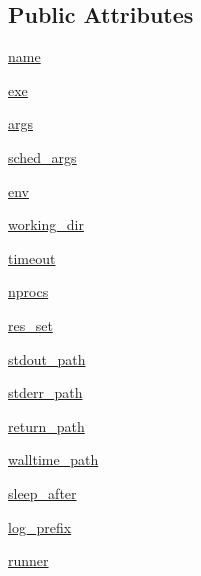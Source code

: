 \subsection*{Public Attributes}
\begin{DoxyCompactItemize}
\item 
\hyperlink{classcodar_1_1savanna_1_1model_1_1_run_a135987f2d76c2b733237f9128df90b55}{name}
\item 
\hyperlink{classcodar_1_1savanna_1_1model_1_1_run_af3869303fd11d0eea96c69adda61ffbf}{exe}
\item 
\hyperlink{classcodar_1_1savanna_1_1model_1_1_run_a2e95781a43d4b3146b10b98c6df429a4}{args}
\item 
\hyperlink{classcodar_1_1savanna_1_1model_1_1_run_a530b04dbe3d3a1feea2e970c2c7cc4a0}{sched\+\_\+args}
\item 
\hyperlink{classcodar_1_1savanna_1_1model_1_1_run_aca381aeba4c386241910c0ecffa97189}{env}
\item 
\hyperlink{classcodar_1_1savanna_1_1model_1_1_run_aa7acd6225eca948ecf25d122d1cca66d}{working\+\_\+dir}
\item 
\hyperlink{classcodar_1_1savanna_1_1model_1_1_run_abb445426d12c93f4b0fffaad44e46f78}{timeout}
\item 
\hyperlink{classcodar_1_1savanna_1_1model_1_1_run_afcec81e8eeb87cecb91a1101ad0b688a}{nprocs}
\item 
\hyperlink{classcodar_1_1savanna_1_1model_1_1_run_a558ab10e87015683e656fd0b8f9ea433}{res\+\_\+set}
\item 
\hyperlink{classcodar_1_1savanna_1_1model_1_1_run_a94ef5e9dc24c400534dc80d80ec5aeb0}{stdout\+\_\+path}
\item 
\hyperlink{classcodar_1_1savanna_1_1model_1_1_run_a55aa41b42450a290a508a17d57fe209d}{stderr\+\_\+path}
\item 
\hyperlink{classcodar_1_1savanna_1_1model_1_1_run_a497134b579d440c7b79281d57cc93aa7}{return\+\_\+path}
\item 
\hyperlink{classcodar_1_1savanna_1_1model_1_1_run_af0cf79c5f8c52048604391d984bd48bc}{walltime\+\_\+path}
\item 
\hyperlink{classcodar_1_1savanna_1_1model_1_1_run_a386d4496d2923fb080c5f43dd325c87b}{sleep\+\_\+after}
\item 
\hyperlink{classcodar_1_1savanna_1_1model_1_1_run_adccd41ed98f61dd602822096a1bdf517}{log\+\_\+prefix}
\item 
\hyperlink{classcodar_1_1savanna_1_1model_1_1_run_a4e689edb49d16bcae268fbda092bbe9c}{runner}
\item 

\end{DoxyCompactItemize}
